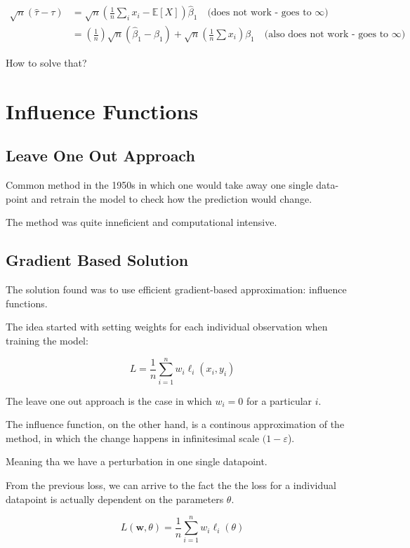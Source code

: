 \documentclass{article}
\begin{document}
\begin{align*}
    \sqrt{n} (\hat{\tau} - \tau)
    &= \sqrt{n} \left(\frac{1}{n} \sum_i x_i - \mathbb{E}[X]\right) \hat{\beta}_1 \quad \text{(does not work - goes to $\infty$)} \\
    &= \left( \frac{1}{n} \right) \sqrt{n} (\hat{\beta}_1 - \beta_1) + \sqrt{n} \left( \frac{1}{n} \sum x_i \right) \beta_1 \quad \text{(also does not work - goes to $\infty$)}
\end{align*}

How to solve that?

\section*{Influence Functions}

\subsection*{Leave One Out Approach}

Common method in the 1950s in which one would take away one single data-point and retrain the model to check how the prediction would change.

The method was quite inneficient and computational intensive.

\subsection*{Gradient Based Solution}

The solution found was to use efficient gradient-based approximation: influence functions.

The idea started with setting weights for each individual observation when training the model:

$$
L = \frac{1}{n} \sum_{i = 1}^n w_i \ell_i (x_i, y_i)
$$

The leave one out approach is the case in which $w_i = 0$ for a particular $i$.

The influence function, on the other hand,  is a continous approximation of the method, in which the change happens in infinitesimal scale $(1 - \varepsilon$).

Meaning tha we have a perturbation in one single datapoint.

From the previous loss, we can arrive to the fact the the loss for a individual datapoint is actually dependent on the parameters $\theta$.

$$
L (\textbf{w}, \theta) = \frac{1}{n} \sum_{i = 1}^n w_i \ell_i (\theta)
$$
\end{document}

